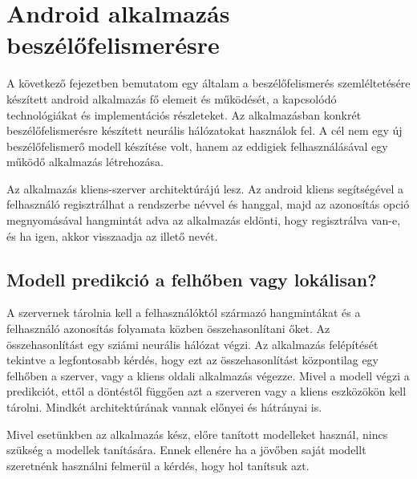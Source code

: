 \chapter{Android alkalmazás beszélőfelismerésre}

A következő fejezetben bemutatom egy általam a beszélőfelismerés szemléltetésére készített android alkalmazás fő elemeit és működését, a kapcsolódó technológiákat és implementációs részleteket. Az alkalmazásban konkrét beszélőfelismerésre készített neurális hálózatokat használok fel. A cél nem egy új beszélőfelismerő modell készítése volt, hanem az eddigiek felhasználásával egy működő alkalmazás létrehozása.

Az alkalmazás kliens-szerver architektúrájú lesz. Az android kliens segítségével a felhasználó regisztrálhat a rendszerbe névvel és hanggal, majd az azonosítás opció megnyomásával hangmintát adva az alkalmazás eldönti, hogy regisztrálva van-e, és ha igen, akkor visszaadja az illető nevét.

\section{Modell predikció a felhőben vagy lokálisan?} \label{cloud_or_local}


A szervernek tárolnia kell a felhasználóktól származó hangmintákat és a felhasználó azonosítás folyamata közben összehasonlítani őket. Az összehasonlítást egy sziámi neurális hálózat végzi. Az alkalmazás felépítését tekintve a legfontosabb kérdés, hogy ezt az összehasonlítást központilag egy felhőben a szerver, vagy a kliens oldali alkalmazás végezze. Mivel a modell végzi a predikciót, ettől a döntéstől függően azt a szerveren vagy a kliens eszközökön kell tárolni. Mindkét architektúrának vannak előnyei és hátrányai is.

Mivel esetünkben az alkalmazás kész, előre tanított modelleket használ, nincs szükség a modellek tanítására. Ennek ellenére ha a jövőben saját modellt szeretnénk használni felmerül a kérdés, hogy hol tanítsuk azt.

